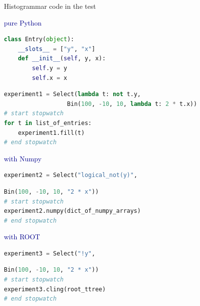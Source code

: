 \documentclass{beamer}
\begin{document}
\begin{frame}[fragile]{Histogrammar code in the test}
\vspace{0.3 cm}

\hfill \textcolor{darkblue}{pure Python}

\vspace{-0.5 cm}
\begin{minipage}{0.8\linewidth}
\begin{lstlisting}[language=python]
class Entry(object):
    __slots__ = ["y", "x"]
    def __init__(self, y, x):
        self.y = y
        self.x = x
\end{lstlisting}
\end{minipage}

\vspace{-0.25 cm}
\begin{minipage}{\linewidth}
\begin{lstlisting}[language=python]
experiment1 = Select(lambda t: not t.y,
                  Bin(100, -10, 10, lambda t: 2 * t.x))
# start stopwatch
for t in list_of_entries:
    experiment1.fill(t)
# end stopwatch
\end{lstlisting}
\end{minipage}

\hfill \textcolor{darkblue}{with Numpy}

\vspace{-0.5 cm}
\begin{minipage}{0.8\linewidth}
\begin{lstlisting}[language=python]
experiment2 = Select("logical_not(y)",
\end{lstlisting}
\end{minipage}

\vspace{-0.45 cm}
\begin{minipage}{\linewidth}
\begin{lstlisting}[language=python]
                  Bin(100, -10, 10, "2 * x"))
# start stopwatch
experiment2.numpy(dict_of_numpy_arrays)
# end stopwatch
\end{lstlisting}
\end{minipage}

\hfill \textcolor{darkblue}{with ROOT}

\vspace{-0.5 cm}
\begin{minipage}{0.8\linewidth}
\begin{lstlisting}[language=python]
experiment3 = Select("!y",
\end{lstlisting}
\end{minipage}

\vspace{-0.45 cm}
\begin{minipage}{\linewidth}
\begin{lstlisting}[language=python]
                  Bin(100, -10, 10, "2 * x"))
# start stopwatch
experiment3.cling(root_ttree)
# end stopwatch
\end{lstlisting}
\end{minipage}
\end{frame}
\end{document}
